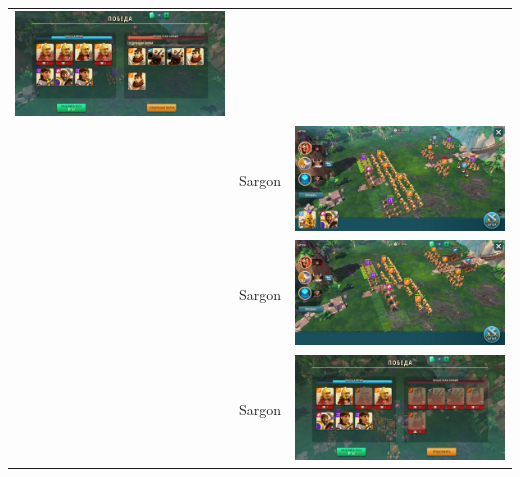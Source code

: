 \begin{longtable}{|c|c|c|}
    \includegraphics[width=0.75\linewidth]{./parts/media/TreasureHunt/33/sargon/photo_2022-04-07_10-06-34.jpg} \\
    & Sargon &
    \includegraphics[width=0.75\linewidth]{./parts/media/TreasureHunt/33/sargon/photo_2022-04-07_10-06-22.jpg} \\
    & Sargon &
    \includegraphics[width=0.75\linewidth]{./parts/media/TreasureHunt/33/sargon/photo_2022-04-07_10-06-37.jpg} \\
    & Sargon &
    \includegraphics[width=0.75\linewidth]{./parts/media/TreasureHunt/33/sargon/photo_2022-04-07_10-06-40.jpg} \\

\end{longtable}
